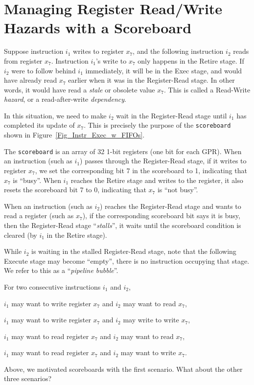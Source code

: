 \section{Managing Register Read/Write Hazards with a Scoreboard}

\label{Sec_Scoreboards}

Suppose instruction $i_1$ writes to register $x_7$, and the following
instruction $i_2$ reads from register $x_7$.  Instruction $i_1$'s
write to $x_7$ only happens in the Retire stage.  If $i_2$ were to
follow behind $i_1$ immediately, it will be in the Exec stage, and
would have already read $x_7$ earlier when it was in the Register-Read
stage.  In other words, it would have read a \emph{stale} or obsolete
value $x_7$.  This is called a Read-Write \emph{hazard}, or a
read-after-write \emph{dependency}.

In this situation, we need to make $i_2$ wait in the Register-Read
stage until $i_1$ has completed its update of $x_7$.  This is
precisely the purpose of the \verb|scoreboard| shown in
Figure~\ref{Fig_Instr_Exec_w_FIFOs}.

The \verb|scoreboard| is an array of 32 1-bit registers (one bit for
each GPR).  When an instruction (such as $i_1$) passes through the
Register-Read stage, if it writes to register $x_7$, we set the
corresponding bit 7 in the scoreboard to 1, indicating that $x_7$ is
``busy''.  When $i_1$ reaches the Retire stage and writes to the
register, it also resets the scoreboard bit 7 to 0, indicating that
$x_7$ is ``not busy''.

When an instruction (such as $i_2$) reaches the Register-Read stage
and wants to read a register (such as $x_7$), if the corresponding
scoreboard bit says it is busy, then the Register-Read stage
``\emph{stalls}'', {\ie} it waits until the scoreboard condition is
cleared (by $i_1$ in the Retire stage).


While $i_2$ is waiting in the stalled Register-Read stage, note that
the following Execute stage may become ``empty'', {\ie} there is no
instruction occupying that stage.  We refer to this as a
``\emph{pipeline bubble}''.

\hdivider

\Exercise

For two consecutive instructions $i_1$ and $i_2$,
  \begin{tightlist}
    \item $i_1$ may want to write register $x_7$ and $i_2$ may want to read $x_7$,
    \item $i_1$ may want to write register $x_7$ and $i_2$ may write to write $x_7$,
    \item $i_1$ may want to read register $x_7$ and $i_2$ may want to read $x_7$,
    \item $i_1$ may want to read register $x_7$ and $i_2$ may want to write $x_7$.
  \end{tightlist}
Above, we motivated scoreboards with the first scenario.  What about
the other three scenarios?

